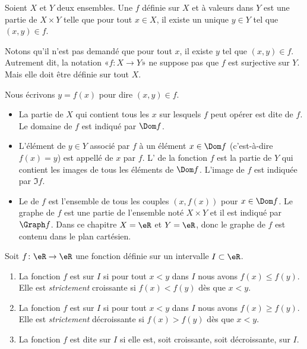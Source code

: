 \begin{definition}
	Soient \( X\) et \( Y\) deux ensembles. Une  \( f\) définie sur \( X\) et à valeurs dans \( Y\) est une partie de \( X\times Y\) telle que pour tout \( x\in X\), il existe un unique \( y\in Y\) tel que \( (x,y)\in f\).

	Notons qu'il n'est pas demandé que pour tout \( x\), il existe \( y\) tel que \( (x,y)\in f\). Autrement dit, la notation «\( f\colon X\to Y\)» ne suppose pas que \( f\) est surjective sur \( Y\). Mais elle doit être définie sur tout \( X\).

	Nous écrivons \( y=f(x)\) pour dire \( (x,y)\in f\).
	\begin{itemize}
		\item La partie de \( X\) qui contient tous les \( x\) sur lesquels \( f\) peut opérer est dite  de \( f\). Le domaine de \( f\) est indiqué par \( \Dom f\).
		\item L'élément de \( y\in Y\) associé par \( f\) à un élément \( x\in \Dom f\) (c'est-à-dire \( f(x) = y\))  est appellé  de \( x\) par \( f\). L' de la fonction \( f\) est la partie de \( Y\) qui contient les images de tous les éléments de \( \Dom f\). L'image de \( f\) est indiquée par \( \Im f\).
		\item Le  de \( f\) est l'ensemble de tous les couples \( (x, f(x))\) pour \( x\in \Dom f\). Le graphe de \( f\) est une partie de l'ensemble noté \( X\times Y\) et il est indiqué par \( \Graph f\). Dans ce chapitre \( X = \eR\) et \( Y = \eR\), donc le graphe de \( f\) est contenu dans le plan cartésien.
	\end{itemize}
\end{definition}

\begin{definition}
	Soit \( f\colon \eR\to \eR\) une fonction définie sur un intervalle \( I\subset \eR\).
	\begin{enumerate}
		\item
		      La fonction \( f\) est  sur \( I\) si pour tout \( x<y\) dans \( I\) nous avons \( f(x)\leq f(y)\). Elle est \emph{strictement} croissante si \( f(x)<f(y)\) dès que \( x<y\).
		\item
		      La fonction \( f\) est  sur \( I\) si pour tout \( x<y\) dans \( I\) nous avons \( f(x)\geq f(y)\). Elle est \emph{strictement} décroissante si \( f(x)>f(y)\) dès que \( x<y\).
		\item
		      La fonction \( f\) est dite  sur \( I\) si elle est, soit croissante, soit décroissante, sur \( I\).
	\end{enumerate}
\end{definition}

